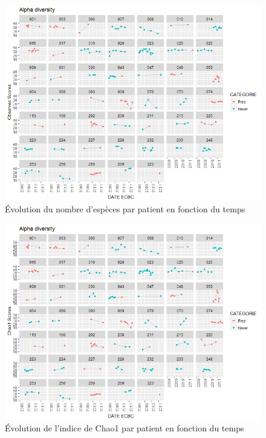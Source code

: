 \documentclass[12pt,a4paper]{article}
\begin{document}
\begin{figure}[H]
\begin{center}
\includegraphics[scale=0.8]{img/alpha_observed.png}\hfill
\end{center}
\caption{Évolution du nombre d'espèces par patient en fonction du temps}
\label{alphaObs}
\end{figure}

 \vfill
\begin{figure}[H]
\begin{center}
\includegraphics[scale=0.8]{img/alpha_chao1.png}\hfill
\end{center}
\caption{Évolution de l'indice de Chao1 par patient en fonction du temps}
\label{alphaChao1}
\end{figure}
\end{document}
